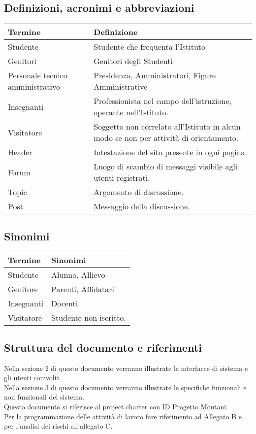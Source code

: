\documentclass{article}
\begin{document}
	\subsection{\textbf{Definizioni, acronimi e abbreviazioni}}
	\begin{tabular}{ |p{3cm}|p{8cm}|  }
	\hline
	\textbf{Termine}& \textbf{Definizione}\\
	\hline
	Studente   & Studente che frequenta l'Istituto  \\
	\hline
	Genitori & Genitori degli Studenti \\
	\hline
	Personale tecnico amministrativo & Presidenza, Amministratori, Figure Amministrative \\
	\hline
	Insegnanti   &  Professionista nel campo dell'istruzione, operante nell'Istituto.  \\
	\hline
	Visitatore  & Soggetto non correlato all'Istituto in alcun modo se non per attività di orientamento. \\	
	\hline
	Header & Intestazione del sito presente in ogni pagina. \\
	Forum & Luogo di scambio di messaggi visibile agli utenti registrati.\\
	Topic & Argomento di discussione.\\
	Post & Messaggio della discussione. \\
\end{tabular}
	
	\subsection{\textbf{Sinonimi}}
\begin{tabular}{ |p{3cm}|p{8cm}|  }
	\hline
	\textbf{Termine}& \textbf{Sinonimi}\\
	\hline
	Studente   & Alunno, Allievo  \\
	\hline
	Genitore   &  Parenti, Affidatari \\
	\hline
	Insegnanti  & Docenti\\	
	\hline
	Visitatore   & Studente non iscritto.  \\
	\hline
\end{tabular}
	
	\subsection{\textbf{Struttura del documento e riferimenti}}
	Nella sezione 2 di questo documento verranno illustrate le interfacce di sistema e gli utenti coinvolti.\\
	Nella sezione 3 di questo documento verranno illustrate le specifiche funzionali e non funzionali del sistema.\\
	Questo documento si riferisce al project charter con ID Progetto Montani.\\
	Per la programmazione delle attività di lavoro fare riferimento ad Allegato B e per l'analisi dei rischi all'allegato C.\\
	
\end{document}
